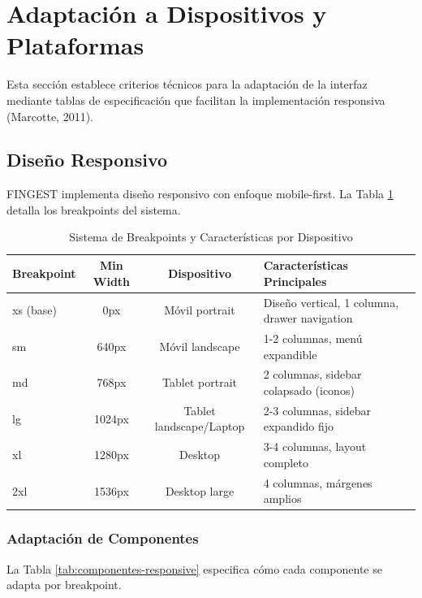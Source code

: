 \documentclass[12pt,a4paper,oneside]{article}
\begin{document}
\section{Adaptación a Dispositivos y Plataformas}

Esta sección establece criterios técnicos para la adaptación de la interfaz mediante tablas de especificación que facilitan la implementación responsiva (Marcotte, 2011).

\subsection{Diseño Responsivo}

FINGEST implementa diseño responsivo con enfoque mobile-first. La Tabla \ref{tab:breakpoints} detalla los breakpoints del sistema.

\begin{table}[h]
\centering
\caption{Sistema de Breakpoints y Características por Dispositivo}
\label{tab:breakpoints}
\small
\begin{tabular}{|l|c|c|p{5cm}|}
\hline
\textbf{Breakpoint} & \textbf{Min Width} & \textbf{Dispositivo} & \textbf{Características Principales} \\
\hline
xs (base) & 0px & Móvil portrait & Diseño vertical, 1 columna, drawer navigation \\
\hline
sm & 640px & Móvil landscape & 1-2 columnas, menú expandible \\
\hline
md & 768px & Tablet portrait & 2 columnas, sidebar colapsado (iconos) \\
\hline
lg & 1024px & Tablet landscape/Laptop & 2-3 columnas, sidebar expandido fijo \\
\hline
xl & 1280px & Desktop & 3-4 columnas, layout completo \\
\hline
2xl & 1536px & Desktop large & 4 columnas, márgenes amplios \\
\hline
\end{tabular}
\end{table}

\subsubsection{Adaptación de Componentes}

La Tabla \ref{tab:componentes-responsive} especifica cómo cada componente se adapta por breakpoint.
\end{document}

